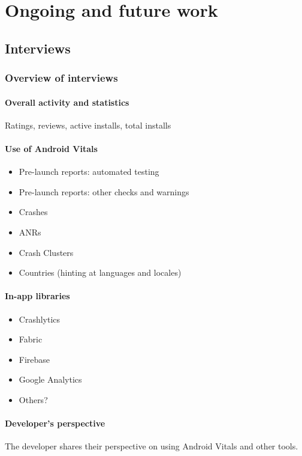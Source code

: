 \chapter{Ongoing and future work}
\section{Interviews}
\subsection{Overview of interviews}

\subsubsection{Overall activity and statistics}
Ratings, reviews, active installs, total installs

\subsubsection{Use of Android Vitals}
\begin{itemize}
    \item Pre-launch reports: automated testing
    \item Pre-launch reports: other checks and warnings
    \item Crashes
    \item ANRs
    \item Crash Clusters
    \item Countries (hinting at languages and locales)
\end{itemize}

\subsubsection{In-app libraries}
\begin{itemize}
    \item Crashlytics
    \item Fabric
    \item Firebase
    \item Google Analytics
    \item Others?
\end{itemize}

\subsubsection{Developer's perspective}
The developer shares their perspective on using Android Vitals and other tools.

